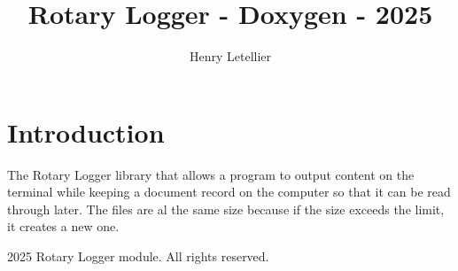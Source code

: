 \documentclass{article}
\begin{document}
\title{Rotary Logger - Doxygen - 2025}
\author{Henry Letellier}
\date{}
\maketitle

\section{Introduction}
The Rotary Logger library that allows a program to output content on the terminal while keeping a document record on the computer so that it can be read through later. The files are al the same size because if the size exceeds the limit, it creates a new one.

\lipsum[1-10]

\clearpage
\thispagestyle{empty} %
\begin{center}
    \small \textcopyright{} 2025 Rotary Logger module. All rights reserved.
\end{center}
\end{document}
